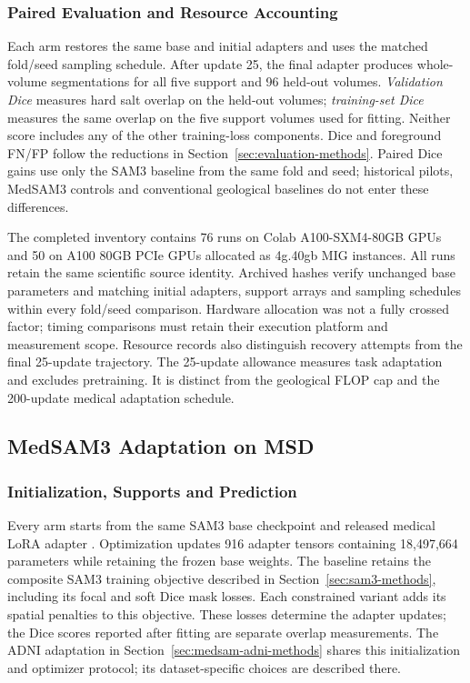 \documentclass[12pt,a4paper]{article}
\begin{document}
\subsubsection{Paired Evaluation and Resource Accounting}

Each arm restores the same base and initial adapters and uses the matched
fold/seed sampling schedule. After update 25, the final adapter produces
whole-volume segmentations for all five support and 96 held-out volumes.
\emph{Validation Dice} measures hard salt overlap on the held-out
volumes; \emph{training-set Dice} measures the same overlap on the five
support volumes used for fitting. Neither score includes any of the
other training-loss components. Dice and foreground FN/FP follow the
reductions in Section~\ref{sec:evaluation-methods}. Paired Dice gains
use only the SAM3 baseline from the same fold and seed;
historical pilots, MedSAM3 controls and conventional geological
baselines do not enter these differences.

The completed inventory contains 76 runs on Colab A100-SXM4-80GB
GPUs and 50 on A100 80GB PCIe GPUs allocated as 4g.40gb MIG instances.
All runs retain the same scientific source identity. Archived hashes
verify unchanged base parameters and matching initial adapters, support
arrays and sampling schedules within every fold/seed comparison.
Hardware allocation was not a fully crossed factor; timing comparisons
must retain their execution platform and measurement scope.
Resource records also distinguish recovery attempts from the final
25-update trajectory. The 25-update allowance
measures task adaptation and excludes pretraining. It is distinct from the geological FLOP cap
and the 200-update medical adaptation schedule.

\subsection{MedSAM3 Adaptation on MSD}
\label{sec:medsam-methods}

\subsubsection{Initialization, Supports and Prediction}

Every arm starts from the same SAM3 base checkpoint and released medical
LoRA adapter \cite{carion2025sam3,liu2025medsam3}. Optimization updates
916 adapter tensors containing 18,497,664 parameters while retaining
the frozen base weights. The baseline retains the composite SAM3
training objective described in Section~\ref{sec:sam3-methods}, including
its focal and soft Dice mask losses. Each constrained variant adds its
spatial penalties to this objective. These losses determine the adapter
updates; the Dice scores reported after fitting are separate overlap
measurements. The ADNI adaptation in
Section~\ref{sec:medsam-adni-methods} shares this initialization and
optimizer protocol; its dataset-specific choices are described there.
\end{document}
